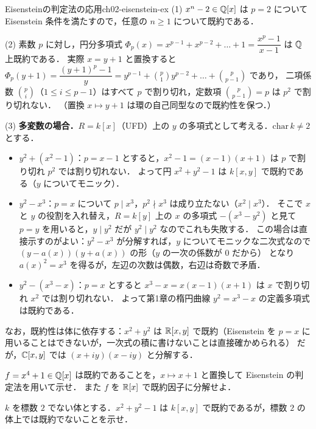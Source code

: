 \begin{myex}{Eisensteinの判定法の応用}{ch02-eisenstein-ex}
(1) $x^n-2\in\mathbb{Q}[x]$ は $p=2$ について Eisenstein 条件を満たすので，任意の $n\ge1$ について既約である．

(2) 素数 $p$ に対し，円分多項式 $\Phi_p(x)=x^{p-1}+x^{p-2}+\dots+1=\dfrac{x^p-1}{x-1}$ は $\mathbb{Q}$ 上既約である．
実際 $x=y+1$ と置換すると $\Phi_p(y+1)=\dfrac{(y+1)^p-1}{y}=y^{p-1}+\binom{p}{1}y^{p-2}+\dots+\binom{p}{p-1}$ であり，
二項係数 $\binom pi$（$1\le i\le p-1$）はすべて $p$ で割り切れ，定数項 $\binom{p}{p-1}=p$ は $p^2$ で割り切れない．
（置換 $x\mapsto y+1$ は環の自己同型なので既約性を保つ．）

(3) \textbf{多変数の場合．}$R=k[x]$（UFD）上の $y$ の多項式として考える．$\mathrm{char}\,k\ne2$ とする．
\begin{itemize}
  \item $y^2+(x^2-1)$：$p=x-1$ とすると，$x^2-1=(x-1)(x+1)$ は $p$ で割り切れ $p^2$ では割り切れない．
        よって円 $x^2+y^2-1$ は $k[x,y]$ で既約である（$y$ についてモニック）．
  \item $y^2-x^3$：$p=x$ について $p\mid x^3$，$p^2\nmid x^3$ は成り立たない（$x^2\mid x^3$）．
        そこで $x$ と $y$ の役割を入れ替え，$R=k[y]$ 上の $x$ の多項式 $-(x^3-y^2)$ と見て $p=y$ を用いると，$y\mid y^2$ だが $y^2\mid y^2$ なのでこれも失敗する．
        この場合は直接示すのがよい：$y^2-x^3$ が分解すれば，$y$ についてモニックな二次式なので $(y-a(x))(y+a(x))$ の形（$y$ の一次の係数が $0$ だから）
        となり $a(x)^2=x^3$ を得るが，左辺の次数は偶数，右辺は奇数で矛盾．
  \item $y^2-(x^3-x)$：$p=x$ とすると $x^3-x=x(x-1)(x+1)$ は $x$ で割り切れ $x^2$ では割り切れない．
        よって第1章の楕円曲線 $y^2=x^3-x$ の定義多項式は既約である．
\end{itemize}
なお，既約性は体に依存する：$x^2+y^2$ は $\mathbb{R}[x,y]$ で既約（Eisenstein を $p=x$ に用いることはできないが，一次式の積に書けないことは直接確かめられる）
だが，$\mathbb{C}[x,y]$ では $(x+iy)(x-iy)$ と分解する．
\end{myex}

$f=x^4+1\in\mathbb{Q}[x]$ は既約であることを，$x\mapsto x+1$ と置換して Eisenstein の判定法を用いて示せ．
また $f$ を $\mathbb{R}[x]$ で既約因子に分解せよ．

$k$ を標数 $2$ でない体とする．$x^2+y^2-1$ は $k[x,y]$ で既約であるが，標数 $2$ の体上では既約でないことを示せ．

